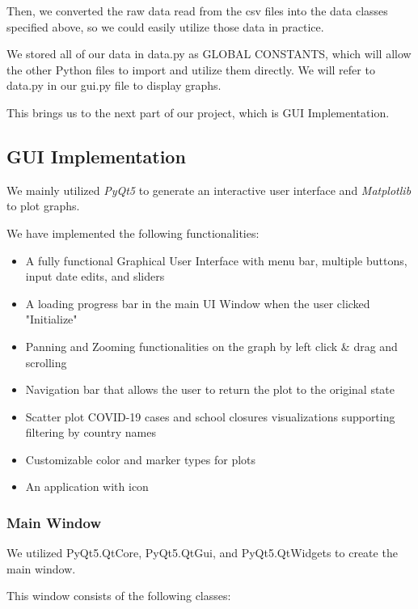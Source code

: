 \documentclass[fontsize=11pt]{article}
\begin{document}
    Then, we converted the raw data read from the csv files into the data classes specified above, so we could easily utilize those data in practice.

    We stored all of our data in data.py as GLOBAL CONSTANTS, which will allow the other Python files to import and utilize them directly. We will refer to data.py in our gui.py file to display graphs.

    This brings us to the next part of our project, which is GUI Implementation.

    \subsection{GUI Implementation}

    We mainly utilized \emph{PyQt5} to generate an interactive user interface and \emph{Matplotlib} to plot graphs.

    We have implemented the following functionalities:

    \begin{itemize}
        \item A fully functional Graphical User Interface with menu bar, multiple buttons, input date edits, and sliders
        \item A loading progress bar in the main UI Window when the user clicked "Initialize"
        \item Panning and Zooming functionalities on the graph by left click \& drag and scrolling
        \item Navigation bar that allows the user to return the plot to the original state
        \item Scatter plot COVID-19 cases and school closures visualizations supporting filtering by country names
        \item Customizable color and marker types for plots
        \item An application with icon
    \end{itemize}

    \subsubsection{Main Window}

    We utilized PyQt5.QtCore, PyQt5.QtGui, and PyQt5.QtWidgets to create the main window.

    This window consists of the following classes:
\end{document}
